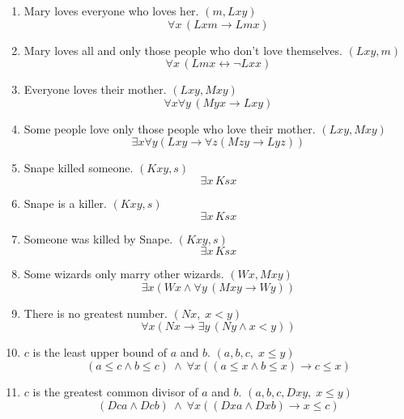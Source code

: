 \documentclass[12pt,fleqn]{article}
\begin{document}
\begin{enumerate}
  \item Mary loves everyone who loves her.  $(m, Lxy)$
  \[
    \forall x\, (Lxm \rightarrow Lmx)
  \]

  \item Mary loves all and only those people who don't love themselves. $(Lxy, m)$
  \[
    \forall x\, (Lmx \leftrightarrow \neg Lxx)
  \]

  \item Everyone loves their mother. $(Lxy, Mxy)$
  \[
    \forall x \forall y\, (Myx \rightarrow Lxy)
  \]

  \item Some people love only those people who love their mother. $(Lxy, Mxy)$
  \[
    \exists x \forall y (Lxy \rightarrow \forall z (Mzy \rightarrow
    Lyz))
  \]

  \item Snape killed someone. $(Kxy, s)$
  \[
    \exists x\, Ksx
  \]

  \item Snape is a killer. $(Kxy, s)$
  \[
    \exists x\, Ksx
  \]
\item Someone was killed by Snape. $(Kxy,s)$
  \[
    \exists x\, Ksx
  \]

  \item Some wizards only marry other wizards. $(Wx,Mxy)$
  \[
    \exists x ( Wx \wedge \forall y\,(Mxy \rightarrow Wy) )
  \]

  \item There is no greatest number. $(Nx,\; x<y)$
  \[
    \forall x( Nx \rightarrow \exists y\, (Ny \wedge x<y) )
  \]

  \item $c$ is the least upper bound of $a$ and $b$. $(a,b,c,\; x\le y)$
  \[
    (a \le c \wedge b \le c)\ \wedge\
    \forall x( (a \le x \wedge b \le x) \rightarrow c \le x )
  \]

  \item $c$ is the greatest common divisor of $a$ and $b$. $(a,b,c,Dxy,\; x\le y)$
  \[
    (Dca \wedge Dcb)\ \wedge\
    \forall x( (Dxa \wedge Dxb) \rightarrow x \le c )
  \]

  
\end{enumerate}
\end{document}
